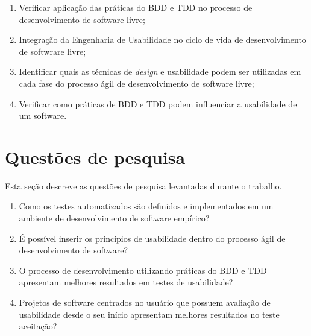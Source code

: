 \begin{enumerate}
\item Verificar aplicação das práticas do BDD e TDD no processo de desenvolvimento de software livre;
\item Integração da Engenharia de Usabilidade no ciclo de vida de desenvolvimento de softwrare livre;
\item Identificar quais as técnicas de \emph{design} e usabilidade  podem ser utilizadas em cada fase do processo ágil de desenvolvimento de software livre;
\item Verificar como práticas de BDD e TDD podem influenciar a usabilidade de um software.



\end{enumerate}

\section{Questões de pesquisa}

Esta seção descreve as questões de pesquisa levantadas durante o trabalho.

\begin{enumerate}
\item Como os testes automatizados são definidos e implementados em um ambiente de desenvolvimento de software empírico?
\item É possível inserir os princípios de usabilidade dentro do processo ágil de desenvolvimento de software?
\item O processo de desenvolvimento utilizando práticas do BDD e TDD apresentam melhores resultados em testes de usabilidade?
\item Projetos de software centrados no usuário que possuem avaliação de usabilidade desde o seu início apresentam melhores resultados no teste aceitação?
\end{enumerate}
	 
